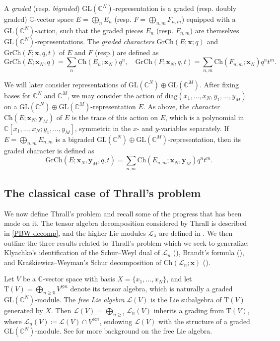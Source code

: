 \documentclass[11pt]{article}
\theoremstyle{definition}
\numberwithin{equation}{section}
\newcommand\CC{\mathbb{C}}
\newcommand\GL{\mathrm{GL}}
\newcommand\grch{\mathrm{GrCh}}
\newcommand\Trm{\mathrm{T}}
\newcommand\xb{\mathbf{x}}
\newcommand\yb{\mathbf{y}}
\newcommand\Lcal{\mathcal{L}}
\newcommand\Ch{\mathrm{Ch}}
\begin{document}
A \emph{graded} (resp. \emph{bigraded}) $\GL(\CC^N)$-representation is a graded (resp. doubly graded) $\CC$-vector space $E = \bigoplus_n E_n$ (resp. $F = \bigoplus_{n,m} F_{n,m}$) equipped with a $\GL(\CC^N)$-action, such that the graded pieces $E_n$ (resp. $F_{n,m}$) are themselves $\GL(\CC^N)$-representations. The \emph{graded characters} $\grch(E;\xb;q)$ and $\grch(F;\xb,q,t)$ of $E$ and $F$ (resp.) are defined as
\[
\grch(E;\xb_N,q) = \sum_n \Ch(E_n;\xb_N)q^n, \quad \grch(F;\xb_N,q,t) = \sum_{n,m} \Ch(F_{n,m};\xb_N)q^nt^m.
\]

We will later consider representations of $\GL(\CC^N) \oplus \GL(\CC^M)$. After fixing bases for $\CC^N$ and $\CC^M$, we may consider the action of $\mathrm{diag}(x_1,\ldots,x_N,y_1,\ldots,y_M)$ on a $\GL(\CC^N) \oplus \GL(\CC^M)$-representation $E$. As above, the \emph{character} $\Ch(E;\xb_N,\yb_M)$ of $E$ is the trace of this action on $E$, which is a polynomial in $\CC[x_1,\ldots,x_N;y_1,\ldots,y_M]$, symmetric in the $x$- and $y$-variables separately. If $E = \bigoplus_{n,m} E_{n,m}$ is a bigraded $\GL(\CC^N) \oplus \GL(\CC^M)$-representation, then its graded character is defined as
\[
\grch(E;\xb_N,\yb_M,q,t) = \sum_{n,m} \Ch(E_{n,m};\xb_N,\yb_M)q^nt^m.
\]
\subsection{The classical case of Thrall's problem}\label{sec:Thrall-classical}
We now define Thrall's problem and recall some of the progress that has been made on it. The tensor algebra decomposition considered by Thrall is described in \eqref{PBW-decomp}, and the higher Lie modules $\Lcal_\lambda$ are defined in . We then outline the three results related to Thrall's problem which we seek to generalize: Klyachko's identification of the Schur--Weyl dual of $\Lcal_n$ (), Brandt's formula (), and Kra{\'s}kiewicz--Weyman's Schur decomposition of $\Ch(\Lcal_n;\xb)$ ().

Let $V$ be a $\CC$-vector space with basis $X = \{ x_1,\ldots,x_N \}$, and let $\Trm(V) = \bigoplus_{n \ge 0} V^{\otimes n}$ denote its tensor algebra, which is naturally a graded $\GL(\CC^N)$-module. The \emph{free Lie algebra} $\Lcal(V)$ is the Lie subalgebra of $\Trm(V)$ generated by $X$. Then $\Lcal(V) = \bigoplus_{n \ge 1} \Lcal_n(V)$ inherits a grading from $\Trm(V)$, where $\Lcal_n(V) \coloneqq \Lcal(V) \cap V^{\otimes n}$, endowing $\Lcal(V)$ with the structure of a graded $\GL(\CC^N)$-module. See \cite{Reu} for more background on the free Lie algebra.
\end{document}
